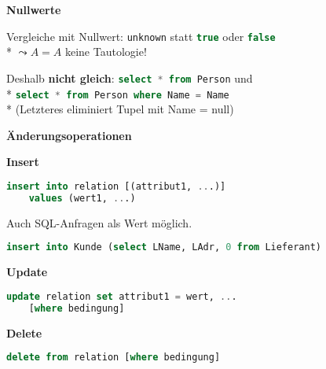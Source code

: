 \textbf{Nullwerte}
\begin{items}
	\item Vergleiche mit Nullwert: \lstinline[language=sql]{unknown} statt \lstinline[language=sql]{true} oder \lstinline[language=sql]{false} \\*
	\( \leadsto A=A \) keine Tautologie!
	\item Deshalb \textbf{nicht gleich}: \lstinline[language=sql]{select * from Person} und \\* \lstinline[language=sql]{select * from Person where Name = Name}\\*
	(Letzteres eliminiert Tupel mit Name = null)
\end{items}

\textbf{Änderungsoperationen}
\begin{items}
	\item \textbf{Insert}
	\begin{lstlisting}[language=sql]
insert into relation [(attribut1, ...)]
	values (wert1, ...)
	\end{lstlisting}
	
	\item Auch SQL-Anfragen als Wert möglich.
	\begin{lstlisting}[language=sql]
insert into Kunde (select LName, LAdr, 0 from Lieferant)
	\end{lstlisting}
	
	\item \textbf{Update}
	\begin{lstlisting}[language=sql]
update relation set attribut1 = wert, ... 
	[where bedingung]
	\end{lstlisting}
	
	\item \textbf{Delete}
	\begin{lstlisting}[language=sql]
delete from relation [where bedingung]
	\end{lstlisting}
\end{items}

